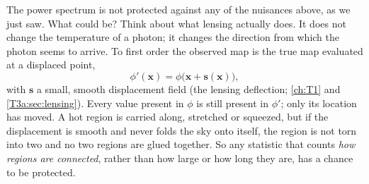 The power spectrum is not protected against any of the nuisances above, as we just saw. What could be?
Think about what lensing actually does. It does not change the temperature of a photon; it changes the
direction from which the photon seems to arrive. To first order the observed map is the true map evaluated
at a displaced point,
\begin{equation}
  \phi'(\bm x)=\phi\big(\bm x+\bm s(\bm x)\big),
  \label{12a:eq:remap}
\end{equation}
with $\bm s$ a small, smooth displacement field (the lensing deflection; \cref{ch:T1} and
\cref{T3a:sec:lensing}). Every value present in $\phi$ is still present in $\phi'$; only its location has
moved. A hot region is carried along, stretched or squeezed, but if the displacement is smooth and never
folds the sky onto itself, the region is not torn into two and no two regions are glued together. So any
statistic that counts \emph{how regions are connected}, rather than how large or how long they are, has a
chance to be protected.

